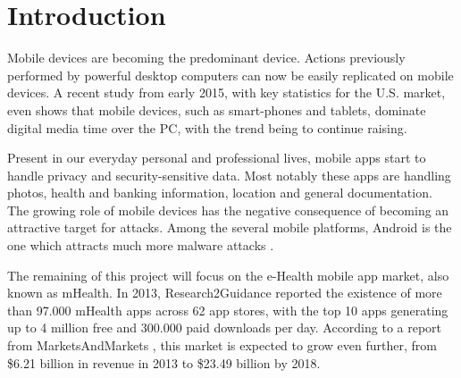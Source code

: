 
% 
% 
\section{Introduction}



Mobile devices are becoming the predominant device. Actions previously performed by powerful desktop computers can now be easily replicated on mobile devices. A recent study \cite{comscore} from early 2015, with key statistics for the U.S. market, even shows that mobile devices, such as smart-phones and tablets, dominate digital media time over the \ac{PC}, with the trend being to continue raising.

Present in our everyday personal and professional lives, mobile \ac{apps} start to handle privacy and security-sensitive data. Most notably these \ac{apps} are handling photos, health and banking information, location and general documentation. The growing role of mobile devices has the negative consequence
of becoming an attractive target for attacks. Among the several mobile platforms, Android is the one which attracts much more malware attacks \cite{fsecure}.


The remaining of this project will focus on the e-Health mobile \ac{app} market, also known as \ac{mHealth}. In 2013, Research2Guidance \cite{research2guidance} reported the existence of more than 97.000 \ac{mHealth} \ac{apps} across 62 app stores, with the top 10 \ac{apps} generating up to 4 million free and 300.000 paid downloads per day. According to a report from MarketsAndMarkets \cite{marketsandmarkets}, this market is expected to grow even further, from \$6.21 billion in revenue in 2013 to \$23.49 billion by 2018.

